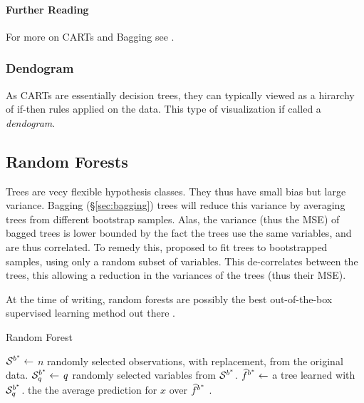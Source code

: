\paragraph{Further Reading}
For more on CARTs and Bagging see \citep[Section 9]{hastie_elements_2003}.


\subsubsection{Dendogram}
\label{sec:dendogram}
As CARTs are essentially decision trees, they can typically viewed as a hirarchy of if-then rules applied on the data.
This type of visualization if called a \emph{dendogram}.





\subsection{Random Forests}
\label{sec:random_forrest}
Trees are vecy flexible hypothesis classes. 
They thus have small bias but large variance.
Bagging (\S\ref{sec:bagging}) trees will reduce this variance by averaging trees from different bootstrap samples. 
Alas, the variance (thus the MSE) of bagged trees is lower bounded by the fact the trees use the same variables, and are thus correlated. 
To remedy this, \citep{breiman_random_2001} proposed to fit trees to bootstrapped samples, using only a random subset of variables. This de-correlates between the trees, this allowing a reduction in the variances of the trees (thus their MSE).

At the time of writing, random forests are possibly the best out-of-the-box supervised learning method out there \citep{fernandez-delgado_we_2014}.

\begin{algorithm}[H]
\caption{Random Forest}
\begin{algorithmic}
	\State $\mathcal{S}^{b^*} \gets$ $n$ randomly selected observations, with replacement, from the original data.
	\State $\mathcal{S}^{b^*}_q \gets$ $q$ randomly selected variables from $\mathcal{S}^{b^*}$.
    \State $\widehat{f}^{{b^*}} \gets$ a tree learned with  $\mathcal{S}^{b^*}_q$.
\EndFor
\State \Return the the average prediction for $x$ over $\widehat{f}^{{b^*}}$ .
\end{algorithmic}
\end{algorithm}





